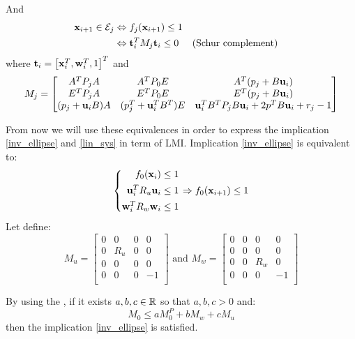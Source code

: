 And
\begin{align*}
 \mathbf{x}_{i+1} \in \mathcal{E}_j
&\Leftrightarrow f_j( \mathbf{x}_{i+1}) \leq 1 \\
&\Leftrightarrow  \mathbf{t}_i^T M_j  \mathbf{t}_i \leq 0 && \text{(Schur complement)}
\end{align*}
where $ \mathbf{t}_i = \left[  \mathbf{x}_i^T,  \mathbf{w}_i^T, 1 \right]^T$ and
\begin{equation}
M_j =
\begin{bmatrix}
A^T P_j A 			& A^T P_0 E 		& A^T (p_j + B  \mathbf{u}_i ) \\
E^T P_j A 			& E^T P_0 E 		& E^T (p_j + B  \mathbf{u}_i) \\
(p_j +  \mathbf{u}_i B) A 	& (p_j^T +  \mathbf{u}_i^T B^T) E  &
 \mathbf{u}_i^T B^T P_j B  \mathbf{u}_i + 2 p^T B  \mathbf{u}_i + r_j - 1\\
\end{bmatrix}
\end{equation}

From now we will use these equivalences in order to express the implication  \ref{inv_ellipse} and \ref{lin_sys} in term of LMI.
Implication \ref{inv_ellipse} is equivalent to:
\begin{equation}
\left\{
\begin{aligned}
f_0( \mathbf{x}_i)   &\leq 1\\
 \mathbf{u}_i^T R_u  \mathbf{u}_i &\leq 1\\
 \mathbf{w}_i^T R_w  \mathbf{w}_i &\leq 1
\end{aligned}
\right.
\Rightarrow
f_0( \mathbf{x}_{i+1}) \leq 1
\end{equation}
Let define:
\begin{equation}
M_u = \begin{bmatrix}
0&0&0&0\\
0&R_u&0&0\\
0&0&0&0\\
0&0&0&-1\\
\end{bmatrix}
\textrm{ and }
M_w = \begin{bmatrix}
0&0&0&0\\
0&0&0&0\\
0&0&R_w&0\\
0&0&0&-1\\
\end{bmatrix}
\end{equation}

By using the \Sproc{}, if it exists $a,b,c \in \mathbb{R}$ so that $a,b,c>0$ and:
\begin{equation}
M_0 \leq a M^P_0 + b M_w + c M_u
\end{equation}
then the implication \ref{inv_ellipse} is satisfied.


